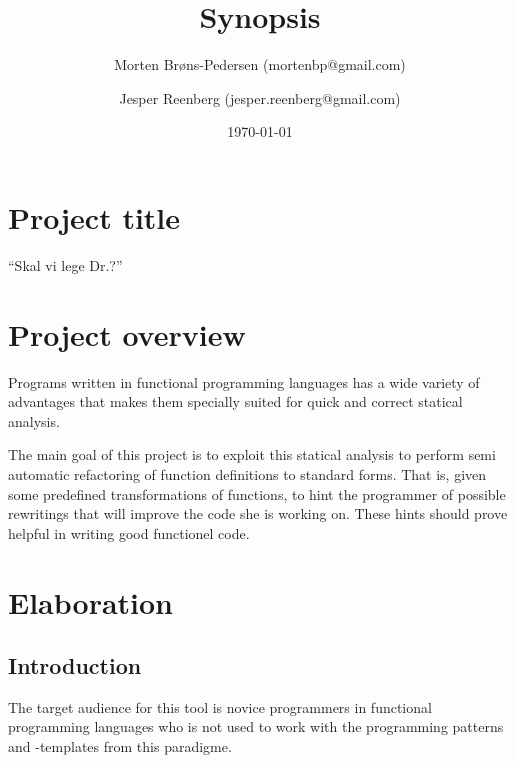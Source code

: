 \documentclass[a4paper,oneside]{memoir}
\title{Synopsis}
\author{%
Morten Brøns-Pedersen (mortenbp@gmail.com) \and
Jesper Reenberg (jesper.reenberg@gmail.com)}
\date{\today}
\begin{document}
\maketitle

\section{Project title}

``Skal vi lege Dr.?''

\section{Project overview}

Programs written in functional programming languages has a wide variety of
advantages that makes them specially suited for quick and correct statical
analysis.


The main goal of this project is to exploit this statical analysis to
perform semi automatic refactoring of function definitions to standard
forms. That is, given some predefined transformations of functions, to
hint the programmer of possible rewritings that will improve the code
she is working on. These hints should prove helpful in writing good
functionel code.



%

\section{Elaboration}

\subsection{Introduction}

The target audience for this tool is novice programmers in functional
programming languages who is not used to work with the programming patterns
and -templates from this paradigme.
\end{document}
